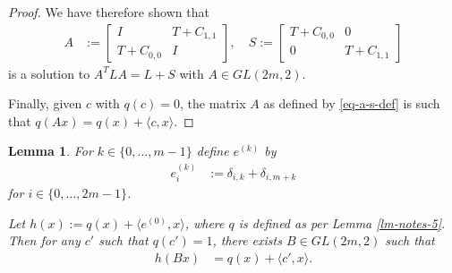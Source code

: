 \documentclass[12pt,a4paper]{article}
\newtheorem{Lemma}{Lemma}
\begin{document}
\begin{proof}
We have therefore shown that
\begin{align}
A 
&:= 
\left[
\begin{array}{cc}
I & T + C_{1,1}
\\
T + C_{0,0} & I
\end{array}
\right],
\quad
S 
:= 
\left[
\begin{array}{cc}
T + C_{0,0} & 0
\\
0 & T + C_{1,1}
\end{array}
\right]
\label{eq-a-s-def}
\end{align}
is a solution to $A^T L A = L + S$ with $A \in GL(2 m, 2)$.

Finally, given $c$ with $q(c)=0$, the matrix $A$ as defined by \eqref{eq-a-s-def} is such that
$q(A x) = q(x) + \langle c, x \rangle$.
\end{proof}

\begin{Lemma}
\label{lm-notes-6}
For $k \in \{0,\ldots,m-1\}$ define $e^{(k)}$ by
\begin{align}
e_i^{(k)} &:= \delta_{i,k} + \delta_{i,m+k}
\label{eq-e-def} 
\end{align}
for $i \in \{0,\ldots,2 m - 1\}$.

Let $h(x) := q(x) + \langle e^{(0)}, x \rangle$, where $q$ is defined as per Lemma \ref{lm-notes-5}.
Then for any $c'$ such that $q(c')=1$, there exists $B \in GL(2 m, 2)$ such that
\begin{align}
h(B x) &= q(x) + \langle c',x \rangle.
\label{eq-h-B-x}
\end{align}
\end{Lemma}
\end{document}
